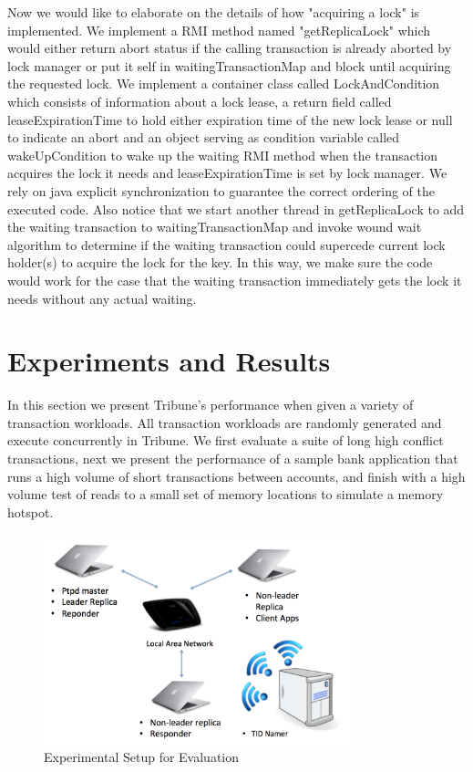 \documentclass[10pt,twocolumn]{article}
\begin{document}
Now we would like to elaborate on the details of how "acquiring a lock" is implemented. We implement a RMI method named "getReplicaLock" which would either return abort status if the calling transaction is already aborted by lock manager or put it self in waitingTransactionMap and block until acquiring the requested lock. We implement a container class called LockAndCondition which consists of information about a lock lease, a return field called leaseExpirationTime to hold either expiration time of the new lock lease or null to indicate an abort and an object serving as condition variable called wakeUpCondition to wake up the waiting RMI method when the transaction acquires the lock it needs and leaseExpirationTime is set by lock manager. We rely on java explicit synchronization to guarantee the correct ordering of the executed code. Also notice that we start another thread in getReplicaLock to add the waiting transaction to waitingTransactionMap and invoke wound wait algorithm to determine if the waiting transaction could supercede current lock holder(s) to acquire the lock for the key. In this way, we make sure the code would work for the case that the waiting transaction immediately gets the 
lock it needs without any actual waiting. 

\section{Experiments and Results}

In this section we present Tribune's performance when given a variety of transaction workloads. All transaction workloads are randomly generated and execute concurrently in Tribune. We first evaluate a suite of long high conflict transactions, next we present the performance of a sample bank application that runs a high volume of short transactions between accounts, and finish with a high volume test of reads to a small set of memory locations to simulate a memory hotspot. 

\begin{figure}[!b]
  \begin{center}
    \includegraphics[width=3.5in]{Images/test-setup.png}
  \end{center}

  \caption{\small Experimental Setup for Evaluation }
  \label{test-setup}
\end{figure}
\end{document}
